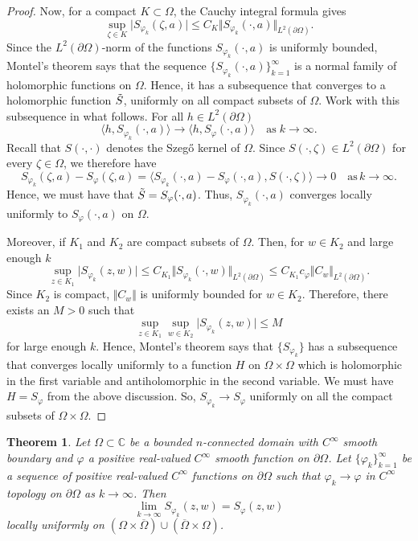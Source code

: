 \documentclass[11pt, reqno]{amsart}
\newtheorem{thm}{Theorem}[section]
\numberwithin{equation}{section}
\begin{document}
\begin{proof}
Now, for a compact $K\subset\Omega$, the Cauchy integral formula gives
\[
\sup_{\zeta\in K}\vert S_{\varphi_k}(\zeta,a)\vert \leq  C_K \Vert S_{\varphi_k}(\cdot,a)\Vert_{L^2(\partial\Omega)}.
\]
Since the $L^2(\partial\Omega)$-norm of the functions $S_{\varphi_k}(\cdot,a)$ is uniformly bounded, Montel's theorem says that the sequence $\{S_{\varphi_k}(\cdot,a)\}_{k=1}^{\infty}$ is a normal family of holomorphic functions on $\Omega$. Hence, it has a subsequence that converges to a holomorphic function $\Tilde{S}$, uniformly on all compact subsets of $\Omega$. Work with this subsequence in what follows. For all $h\in L^2(\partial\Omega)$
\[
\langle h, S_{\varphi_k}(\cdot,a)\rangle\rightarrow\langle h, S_{\varphi}(\cdot,a)\rangle\quad\text{as}\;k\rightarrow\infty.
\]
Recall that $S(\cdot,\cdot)$ denotes the Szeg\H{o} kernel of $\Omega$. Since $S(\cdot,\zeta)\in L^2(\partial\Omega)$ for every $\zeta\in\Omega$, we therefore have
\[
S_{\varphi_k}(\zeta,a)-S_{\varphi}(\zeta,a)=\langle S_{\varphi_k}(\cdot,a)-S_{\varphi}(\cdot,a),S(\cdot,\zeta)\rangle \rightarrow 0 \quad\text{as} \, k\rightarrow\infty.
\]
Hence, we must have that $\Tilde{S}=S_{\varphi}(\cdot,a)$. Thus, $S_{\varphi_k}(\cdot,a)$ converges locally uniformly to $S_{\varphi}(\cdot,a)$ on $\Omega$.

Moreover, if $K_1$ and $K_2$ are compact subsets of $\Omega$. Then, for $w\in K_2$ and large enough $k$
\[
\sup_{z\in K_1}\vert S_{\varphi_k}(z,w)\vert \leq C_{K_1} \Vert S_{\varphi_k}(\cdot,w) \Vert_{L^2(\partial\Omega)}\leq C_{K_1} c_{\varphi} \Vert C_w\Vert_{L^2(\partial\Omega)}.
\]
Since $K_2$ is compact, $\Vert C_w\Vert$ is uniformly bounded for $w\in K_2$. Therefore, there exists an $M>0$ such that
\[
\sup_{z\in K_1}\sup_{w\in K_2}\vert S_{\varphi_k}(z,w)\vert \leq M
\]
for large enough $k$. Hence, Montel's theorem says that $\{S_{\varphi_k}\}$ has a subsequence that converges locally uniformly to a function $H$ on $\Omega\times\Omega$ which is holomorphic in the first variable and antiholomorphic in the second variable. We must have $H=S_{\varphi}$ from the above discussion. So, $S_{\varphi_k}\rightarrow S_{\varphi}$ uniformly on all the compact subsets of $\Omega\times\Omega$.
\end{proof}

\begin{thm}\label{ram 2}
Let $\Omega\subset\mathbb{C}$ be a bounded $n$-connected domain with $C^{\infty}$ smooth boundary and $\varphi$ a positive real-valued $C^{\infty}$ smooth function on $\partial\Omega$. 
Let $\{\varphi_k\}_{k=1}^{\infty}$ be a sequence of positive real-valued $C^{\infty}$ functions on $\partial\Omega$ such that $\varphi_k\rightarrow\varphi$ in $C^{\infty}$ topology on $\partial\Omega$ as $k\rightarrow\infty$. Then 
\[
\lim_{k\rightarrow\infty}S_{\varphi_k}(z,w) = S_{\varphi}(z,w)
\]
locally uniformly on $(\Omega\times\overline{\Omega})\cup(\overline{\Omega}\times\Omega)$.
\end{thm}
\end{document}
